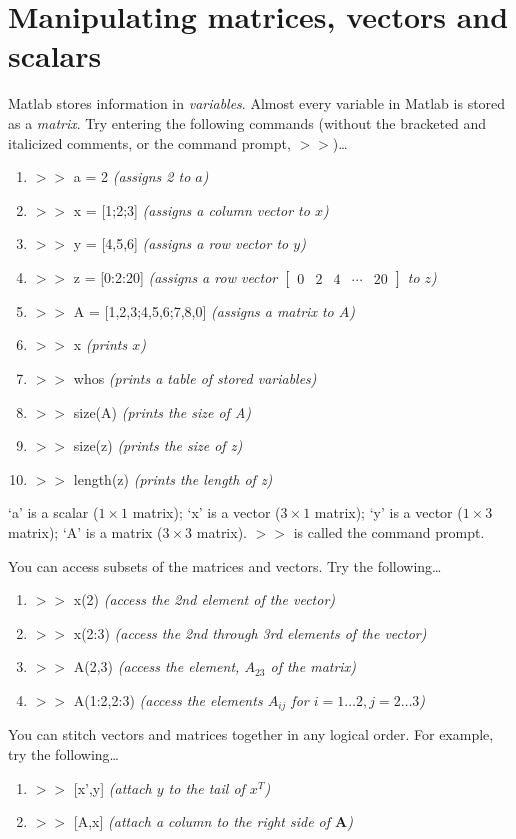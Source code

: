 \documentclass[letter]{article}
\begin{document}
\section*{Manipulating matrices, vectors and scalars}
Matlab stores information in \emph{variables}.  Almost every variable in
Matlab is stored as a \emph{matrix}.  Try entering the following
commands (without the bracketed and italicized comments, or the
command prompt, $>>$)\ldots
\begin{enumerate}
\small
\item $>>$ a = 2 \emph{(assigns 2 to $a$)}
\item $>>$ x = [1;2;3] \emph{(assigns a column vector to $x$)}
\item $>>$ y = [4,5,6] \emph{(assigns a row vector to $y$)}
\item $>>$ z = [0:2:20] \emph{(assigns a row vector
$\left[\begin{array}{ccccc} 0 & 2 & 4 & \cdots & 20 \end{array}\right]$ to $z$)}
\item $>>$ A = [1,2,3;4,5,6;7,8,0] \emph{(assigns a matrix to $A$)}
\item $>>$ x \emph{(prints $x$)}
\item $>>$ whos \emph{(prints a table of stored variables)}
\item $>>$ size(A) \emph{(prints the size of A)}
\item $>>$ size(z) \emph{(prints the size of z)}
\item $>>$ length(z) \emph{(prints the length of z)}
\end{enumerate}
`a' is a scalar ($1\times 1$ matrix); `x' is a vector ($3\times 1$
matrix); `y' is a vector ($1\times 3$ matrix); `A' is a matrix ($3\times 3$
matrix). $>>$ is called the command prompt.

You can access subsets of the matrices and vectors.  Try the
following\ldots
\begin{enumerate}
\small
\item $>>$ x(2) \emph{(access the 2nd element of the vector)}
\item $>>$ x(2:3) \emph{(access the 2nd through 3rd elements of the vector)}
\item $>>$ A(2,3) \emph{(access the element, $A_{23}$ of the matrix)}
\item $>>$ A(1:2,2:3) \emph{(access the elements $A_{ij}$ for
$i=1\ldots 2, j=2\ldots3$)} 
\end{enumerate}

You can stitch vectors and matrices together in any logical
order.  For example, try the following\ldots
\begin{enumerate}
\small
\item $>>$ [x',y] \emph{(attach $y$ to the tail of $x^T$)}
\item $>>$ [A,x] \emph{(attach a column to the right side of $\mathbf{A}$)}
\end{enumerate}
\end{document}
